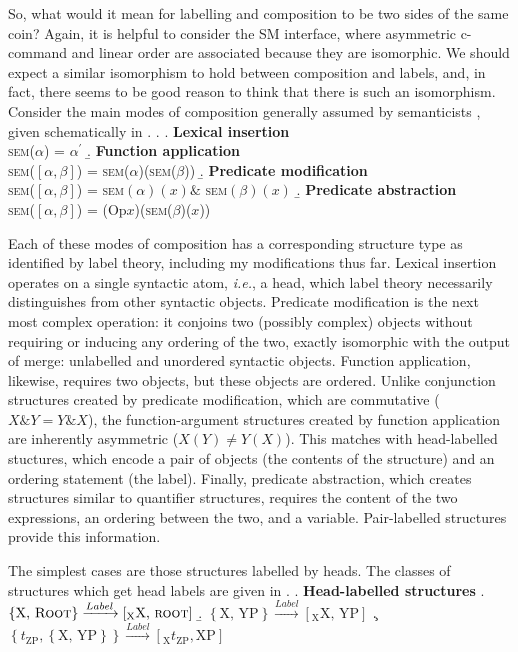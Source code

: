 \documentclass[MilwayThesis]{subfiles}
\begin{document}
So, what would it mean for labelling and composition to be two sides of the same coin?
Again, it is helpful to consider the SM interface, where asymmetric c-command and linear order are associated because they are isomorphic.
We should expect a similar isomorphism to hold between composition and labels, and, in fact, there seems to be good reason to think that there is such an isomorphism.
Consider the main modes of composition generally assumed by semanticists \parencite[\textit{e.g.}, by][]{heimkratzer1998semantics}, given schematically in \Next.
\ex. 
\a. \textbf{Lexical insertion}\\
\textsc{sem}($\alpha$) = $\alpha^\prime$
\b. \textbf{Function application}\\
\textsc{sem}($\left[ \alpha, \beta \right]$) = \textsc{sem}($\alpha$)(\textsc{sem}($\beta$))
\b. \textbf{Predicate modification}\\
\textsc{sem}($\left[ \alpha, \beta \right]$) = \textsc{sem}$(\alpha)(x) \&$ \textsc{sem}$(\beta)(x)$
\b. \textbf{Predicate abstraction}\\
\textsc{sem}($\left[ \alpha, \beta \right]$) = (Op$x$)(\textsc{sem}($\beta$)($x$))

Each of these modes of composition has a corresponding structure type as identified by label theory, including my modifications thus far.
Lexical insertion operates on a single syntactic atom, \textit{i.e.}, a head, which label theory necessarily distinguishes from other syntactic objects.
Predicate modification is the next most complex operation: it conjoins two (possibly complex) objects without requiring or inducing any ordering of the two, exactly isomorphic with the output of merge: unlabelled and unordered syntactic objects.
Function application, likewise, requires two objects, but these objects are ordered.
Unlike conjunction structures created by predicate modification, which are commutative ($X \& Y = Y \& X$), the function-argument structures created by function application are inherently asymmetric ($X(Y) \neq Y(X)$).
This matches with head-labelled stuctures, which encode a pair of objects (the contents of the structure) and an ordering statement (the label).
Finally, predicate abstraction, which creates structures similar to quantifier structures, requires the content of the two expressions, an ordering between the two, and a variable.
Pair-labelled structures provide this information.

The simplest cases are those structures labelled by heads.
The classes of structures which get head labels are given in \Next.
\ex. \textbf{Head-labelled structures}
\a. $\left\{ \text{X, }\textsc{Root} \right\} \xrightarrow{Label} \left[_\text{X} \text{X, }\textsc{root}  \right]$
\b. $\left\{ \text{X, YP} \right\} \xrightarrow{Label} \left[_\text{X} \text{X, YP} \right]$
\c. $\left\{ t_\text{ZP}, \left\{ \text{X, YP} \right\} \right\}\xrightarrow{Label}\left[_\text{X} t_\text{ZP}, \text{XP} \right]$
\end{document}
